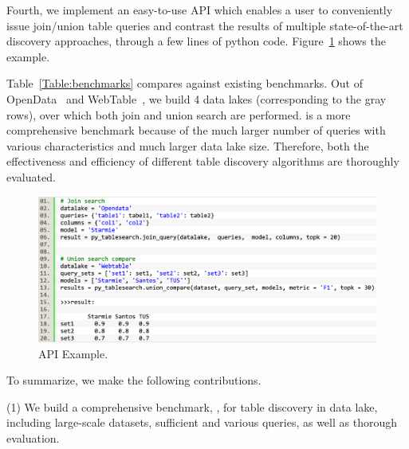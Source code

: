 


Fourth, we implement an easy-to-use API which enables a user to conveniently issue join/union table queries and contrast the results of multiple state-of-the-art discovery approaches, through a few lines of python code. Figure~\ref{fig:api} shows the example.

Table~\ref{Table:benchmarks} compares \sys against existing benchmarks. Out of OpenData~\cite{} and  WebTable~\cite{}, we build 4 data lakes (corresponding to the gray rows), over which  both join and union search are performed. \sys is a more comprehensive benchmark because of the much larger number of queries with various characteristics and much larger data lake size. Therefore, both the effectiveness and efficiency of different table discovery algorithms are thoroughly evaluated. 

\begin{figure}[h]
	\centering
	\includegraphics[width=\linewidth]{fig/api}
	\caption{API Example.}
	\label{fig:api}
\end{figure}

To summarize, we make the following contributions.

\noindent (1) We build a comprehensive benchmark, \sys, for table discovery in data lake, including large-scale datasets, sufficient and various queries, as well as thorough evaluation.  

